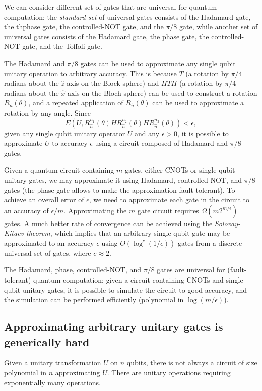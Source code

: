We can consider different set of gates that are universal for quantum computation:
the \emph{standard set} of universal gates consists of the Hadamard gate, the thphase gate, the controlled-NOT gate, and the $\pi/8$ gate,
while another set of universal gates consists of the Hadamard gate, the phase gate, the controlled-NOT gate, and the Toffoli gate.

The Hadamard and $\pi/8$ gates can be used to approximate any single qubit unitary operation to arbitrary accuracy.
This is because $T$ (a rotation by $\pi/4$ radians about the $\hat{z}$ axis on the Block sphere)
and $HTH$ (a rotation by $\pi/4$ radians about the $\hat{x}$ axis on the Bloch sphere)
can be used to construct a rotation $R_{\hat{n}}(\theta)$,
and a repeated application of $R_{\hat{n}}(\theta)$ can be used to approximate a rotation by any angle.
Since
\[
    E\left(U, R_{\hat{n}}^{n_1}(\theta)HR_{\hat{n}}^{n_2}(\theta)HR_{\hat{n}}^{n_3}(\theta)\right) < \epsilon,
\]
given any single qubit unitary operator $U$ and any $\epsilon > 0$,
it is possible to approximate $U$ to accuracy $\epsilon$ using a circuit composed of Hadamard and $\pi/8$ gates.

Given a quantum circuit containing $m$ gates, either CNOTs or single qubit unitary gates,
we may approximate it using Hadamard, controlled-NOT, and $\pi/8$ gates
(the phase gate allows to make the approximation fault-tolerant).
To achieve an overall error of $\epsilon$,
we need to approximate each gate in the circuit to an accuracy of $\epsilon/m$.
Approximating the $m$ gate circuit requires $\Omega(m2^{m/\epsilon})$ gates.
A much better rate of convergence can be achieved using the \emph{Solovay-Kitaev theorem},
which implies that an arbitrary single qubit gate may be approximated to an accuracy $\epsilon$ using $O(\log^c(1/\epsilon))$ gates from a discrete universal set of gates,
where $c \approx 2$.

The Hadamard, phase, controlled-NOT, and $\pi/8$ gates are universal for (fault-tolerant) quantum computation;
given a circuit containing CNOTs and single qubit unitary gates,
it is possible to simulate the circuit to good accuracy,
and the simulation can be performed efficiently (polynomial in $\log(m/\epsilon)$).

\subsection{Approximating arbitrary unitary gates is generically hard}
Given a unitary transformation $U$ on $n$ qubits, there is not always a circuit of size polynomial in $n$ approximating $U$.
There are unitary operations requiring exponentially many operations.

